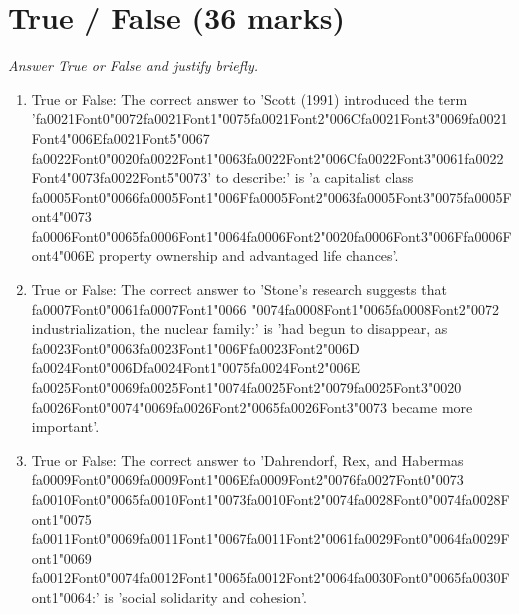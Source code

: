 \documentclass[12pt]{article}
\begin{document}
\section*{True / False (36 marks)}
\textit{Answer True or False and justify briefly.}
\begin{enumerate}[label=\arabic*.]
\item True or False: The correct answer to 'Scott (1991) introduced the term '{\csname fa0021Font0\endcsname\char"0072}{\csname fa0021Font1\endcsname\char"0075}{\csname fa0021Font2\endcsname\char"006C}{\csname fa0021Font3\endcsname\char"0069}{\csname fa0021Font4\endcsname\char"006E}{\csname fa0021Font5\endcsname\char"0067} {\csname fa0022Font0\endcsname\char"0020}{\csname fa0022Font1\endcsname\char"0063}{\csname fa0022Font2\endcsname\char"006C}{\csname fa0022Font3\endcsname\char"0061}{\csname fa0022Font4\endcsname\char"0073}{\csname fa0022Font5\endcsname\char"0073}' to describe:' is 'a capitalist class {\csname fa0005Font0\endcsname\char"0066}{\csname fa0005Font1\endcsname\char"006F}{\csname fa0005Font2\endcsname\char"0063}{\csname fa0005Font3\endcsname\char"0075}{\csname fa0005Font4\endcsname\char"0073} {\csname fa0006Font0\endcsname\char"0065}{\csname fa0006Font1\endcsname\char"0064}{\csname fa0006Font2\endcsname\char"0020}{\csname fa0006Font3\endcsname\char"006F}{\csname fa0006Font4\endcsname\char"006E} property ownership and advantaged life chances'.
\item True or False: The correct answer to 'Stone's research suggests that {\csname fa0007Font0\endcsname\char"0061}{\csname fa0007Font1\endcsname\char"0066} {\char"0074}{\csname fa0008Font1\endcsname\char"0065}{\csname fa0008Font2\endcsname\char"0072} industrialization, the nuclear family:' is 'had begun to disappear, as {\csname fa0023Font0\endcsname\char"0063}{\csname fa0023Font1\endcsname\char"006F}{\csname fa0023Font2\endcsname\char"006D} {\csname fa0024Font0\endcsname\char"006D}{\csname fa0024Font1\endcsname\char"0075}{\csname fa0024Font2\endcsname\char"006E} {\csname fa0025Font0\endcsname\char"0069}{\csname fa0025Font1\endcsname\char"0074}{\csname fa0025Font2\endcsname\char"0079}{\csname fa0025Font3\endcsname\char"0020} {\csname fa0026Font0\endcsname\char"0074}{\char"0069}{\csname fa0026Font2\endcsname\char"0065}{\csname fa0026Font3\endcsname\char"0073} became more important'.
\item True or False: The correct answer to 'Dahrendorf, Rex, and Habermas {\csname fa0009Font0\endcsname\char"0069}{\csname fa0009Font1\endcsname\char"006E}{\csname fa0009Font2\endcsname\char"0076}{\csname fa0027Font0\endcsname\char"0073} {\csname fa0010Font0\endcsname\char"0065}{\csname fa0010Font1\endcsname\char"0073}{\csname fa0010Font2\endcsname\char"0074}{\csname fa0028Font0\endcsname\char"0074}{\csname fa0028Font1\endcsname\char"0075} {\csname fa0011Font0\endcsname\char"0069}{\csname fa0011Font1\endcsname\char"0067}{\csname fa0011Font2\endcsname\char"0061}{\csname fa0029Font0\endcsname\char"0064}{\csname fa0029Font1\endcsname\char"0069} {\csname fa0012Font0\endcsname\char"0074}{\csname fa0012Font1\endcsname\char"0065}{\csname fa0012Font2\endcsname\char"0064}{\csname fa0030Font0\endcsname\char"0065}{\csname fa0030Font1\endcsname\char"0064}:' is 'social solidarity and cohesion'.

\end{enumerate}
\end{document}
